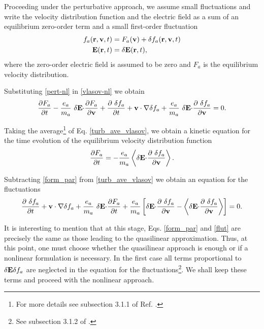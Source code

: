 \documentclass[12pt,a4paper,ruledheader]{report}
\begin{document}
Proceeding under the perturbative approach, we assume small
fluctuations and write the velocity distribution function
and the electric field as a sum of an equilibrium zero-order
term and a small first-order fluctuation
\begin{equation}
  \label{pert-nl}
  \begin{split}
      f_a({\bf r}, {\bf v},t)&=F_a({\bf v})+\delta f_a({\bf r}, {\bf v},t)\\
  {\bf E}({\bf r},t)&=\delta {\bf E}({\bf r},t),
  \end{split}
\end{equation}
where the zero-order electric field is assumed to be zero and
$F_a$ is the equilibrium velocity distribution.

Substituting \eqref{pert-nl} in \eqref{vlasov-nl} we obtain
\begin{equation} 
  \frac{\partial F_a}{\partial t}-\frac{e_a}{m_a}\
  \delta {\bf E \cdot} \frac{\partial F_a}{\partial \bf v}
+\frac{\partial\ \delta f_a}{\partial t}+{\bf v \cdot \nabla} \delta f_a
  +\frac{e_a}{m_a}\ \delta {\bf E \cdot}
  \frac{\partial\ \delta f_a}{\partial \bf v}=0.
\label{turb_ave_vlasov}
\end{equation}

Taking the average\footnote{For more details see subsection 3.1.1
  of Ref. \cite{Tigik2015}.} of Eq. \eqref{turb_ave_vlasov}, we
obtain a kinetic equation for the time evolution of the equilibrium
velocity distribution function
\begin{equation}
\frac{\partial F_a}{\partial t}
=-\frac{e_a}{m_a}\left< \delta {\bf E \cdot}
\frac{\partial\ \delta f_a}{\partial \bf v}\right>.
\label{form_par}
\end{equation}

Subtracting \eqref{form_par} from \eqref{turb_ave_vlasov} we obtain
an equation for the fluctuations
\begin{equation}
\frac{\partial\ \delta f_a}{\partial t}+{\bf v \cdot \nabla} \delta f_a
+\frac{e_a}{m_a}\ \delta {\bf E \cdot} \frac{\partial F_a}{\partial t}
+\frac{e_a}{m_a}\left[\delta {\bf E \cdot} \frac{\partial\ \delta f_a}{\partial \bf v}
-\left< \delta {\bf E \cdot}
\frac{\partial\ \delta f_a}{\partial \bf v}\right>\right]=0.
\label{flut}
\end{equation}

It is interesting to mention that at this stage, Eqs. \eqref{form_par}
and \eqref{flut} are precisely the same as those leading to the
quasilinear approximation.
Thus, at this point, one must choose whether the quasilinear approach
is enough or if a nonlinear formulation is necessary. In the first case
all terms proportional to $\delta {\bf E} \delta f_a$ are neglected in
the equation for the fluctuations\footnote{See subsection 3.1.2 of
  \cite{Tigik2015}.}. We shall keep these terms and proceed with the
nonlinear approach.
\end{document}
